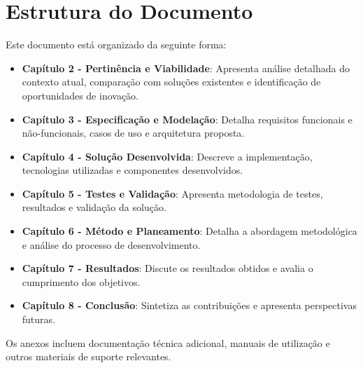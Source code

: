 \section{Estrutura do Documento}

Este documento está organizado da seguinte forma:

\begin{itemize}
    \item \textbf{Capítulo 2 - Pertinência e Viabilidade}: Apresenta análise detalhada do contexto atual, comparação com soluções existentes e identificação de oportunidades de inovação.

    \item \textbf{Capítulo 3 - Especificação e Modelação}: Detalha requisitos funcionais e não-funcionais, casos de uso e arquitetura proposta.

    \item \textbf{Capítulo 4 - Solução Desenvolvida}: Descreve a implementação, tecnologias utilizadas e componentes desenvolvidos.

    \item \textbf{Capítulo 5 - Testes e Validação}: Apresenta metodologia de testes, resultados e validação da solução.

    \item \textbf{Capítulo 6 - Método e Planeamento}: Detalha a abordagem metodológica e análise do processo de desenvolvimento.

    \item \textbf{Capítulo 7 - Resultados}: Discute os resultados obtidos e avalia o cumprimento dos objetivos.

    \item \textbf{Capítulo 8 - Conclusão}: Sintetiza as contribuições e apresenta perspectivas futuras.
\end{itemize}

Os anexos incluem documentação técnica adicional, manuais de utilização e outros materiais de suporte relevantes.

